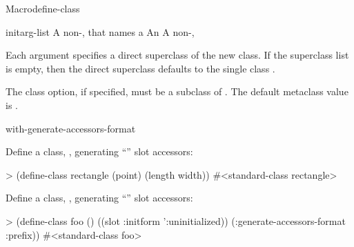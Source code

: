 \documentclass[10pt,twoside,english,pdftex]{article}
\begin{document}
\begin{functiondoc}{Macro}{define-class}
\fnterms
\begin{args}{initarg-list}
 A non-\nil,  that names a
 An 
 A non-\nil, 
\end{args}

\fndescription 
Each  argument specifies a direct superclass of
the new class. If the superclass list is empty, then the direct
superclass defaults to the single class .

%
The  class option, if specified, must be a subclass
of .  The default metaclass value is
.

\begin{alsos}{with-generate-accessors-format}
\end{alsos}

\fnexamples
Define a class, , generating ``'' slot accessors:
%
\W\supp
\begin{example}
> (define-class rectangle (point)
    (length width))
#<standard-class rectangle>
\end{example}

Define a class, , generating
``'' slot accessors:
%
\W\supp
\begin{example}
> (define-class foo ()
    ((slot :initform ':uninitialized))
    (:generate-accessors-format :prefix))
#<standard-class foo>
\end{example}

\end{functiondoc}

\end{document}
